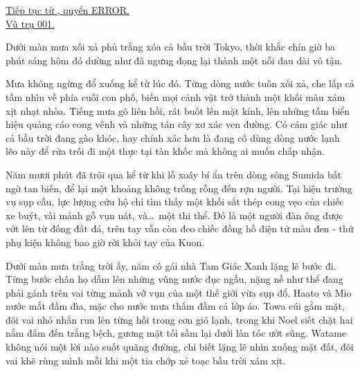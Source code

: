 \documentclass[../main.tex]{subfiles}
\begin{document}

\begin{center}
    \uline{Tiếp tục từ {}, quyển ERROR.}\\
    \uline{Vũ trụ 001.}
\end{center}

Dưới màn mưa xối xả phủ trắng xóa cả bầu trời Tokyo, thời khắc chín giờ ba phút sáng hôm đó dường như đã ngưng đọng lại thành một nỗi đau dài vô tận.

Mưa không ngừng đổ xuống kể từ lúc đó. Từng dòng nước tuôn xối xả, che lấp cả tầm nhìn về phía cuối con phố, biến mọi cảnh vật trở thành một khối màu xám xịt nhạt nhòa. Tiếng mưa gõ liên hồi, rát buốt lên mặt kính, lên những tấm biển hiệu quảng cáo cong vênh và những tán cây xơ xác ven đường. Có cảm giác như cả bầu trời đang gào khóc, hay chính xác hơn là đang cố dùng dòng nước lạnh lẽo này để rửa trôi đi một thực tại tàn khốc mà không ai muốn chấp nhận.

Năm mươi phút đã trôi qua kể từ khi lỗ xoáy bí ẩn trên dòng sông Sumida bất ngờ tan biến, để lại một khoảng không trống rỗng đến rợn người. Tại hiện trường vụ sụp cầu, lực lượng cứu hộ chỉ tìm thấy một khối sắt thép cong vẹo của chiếc xe buýt, vài mảnh gỗ vụn nát, và\dots\ một thi thể. Đó là một người đàn ông được vớt lên từ đống đất đá, trên tay vẫn còn đeo chiếc đồng hồ điện tử màu đen - thứ phụ kiện không bao giờ rời khỏi tay của Kuon.

Dưới màn mưa trắng trời ấy, năm cô gái nhà Tam Giác Xanh lặng lẽ bước đi. Từng bước chân họ dẫm lên những vũng nước đục ngầu, nặng nề như thể đang phải gánh trên vai từng mảnh vỡ vụn của một thế giới vừa sụp đổ. Haato và Mio nước mắt đầm đìa, mặc cho nước mưa thấm đẫm cả lớp áo. Towa cúi gằm mặt, đôi vai nhỏ nhắn run lên từng hồi trong cơn gió lạnh, trong khi Noel siết chặt hai nắm đấm đến trắng bệch, gương mặt tối sầm lại dưới làn tóc ướt sũng. Watame không nói một lời nào suốt quãng đường, chỉ biết lặng lẽ nhìn xuống mặt đất, đôi vai khẽ rùng mình mỗi khi một tia chớp xé toạc bầu trời xám xịt.
\end{document}
